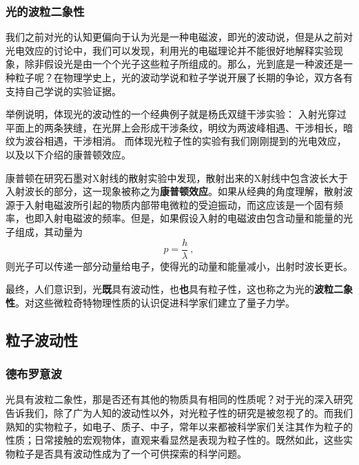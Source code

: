\subsubsection{光的波粒二象性}
我们之前对光的认知更偏向于认为光是一种电磁波，即光的波动说，但是从之前对光电效应的讨论中，我们可以发现，利用光的电磁理论并不能很好地解释实验现象，除非假设光是由一个个光子这些粒子所组成的。那么，光到底是一种波还是一种粒子呢？在物理学史上，光的波动学说和粒子学说开展了长期的争论，双方各有支持自己学说的实验证据。

举例说明，体现光的波动性的一个经典例子就是杨氏双缝干涉实验：
入射光穿过平面上的两条狭缝，在光屏上会形成干涉条纹，明纹为两波峰相遇、干涉相长，暗纹为波谷相遇，干涉相消。
而体现光粒子性的实验有我们刚刚提到的光电效应，以及以下介绍的康普顿效应。

康普顿在研究石墨对X射线的散射实验中发现，散射出来的X射线中包含波长大于入射波长的部分，这一现象被称之为\textbf{康普顿效应}。如果从经典的角度理解，散射波源于入射电磁波所引起的物质内部带电微粒的受迫振动，而这应该是一个固有频率，也即入射电磁波的频率。但是，如果假设入射的电磁波由包含动量和能量的光子组成，其动量为$$p=\dfrac{h}{\lambda}~,$$则光子可以传递一部分动量给电子，使得光的动量和能量减小，出射时波长更长。

最终，人们意识到，光\textbf{既}具有波动性，也\textbf{也}具有粒子性，这也称之为光的\textbf{波粒二象性}。对这些微粒奇特物理性质的认识促进科学家们建立了量子力学。


\subsection{粒子波动性}
\subsubsection{德布罗意波}
光具有波粒二象性，那是否还有其他的物质具有相同的性质呢？对于光的深入研究告诉我们，除了广为人知的波动性以外，对光粒子性的研究是被忽视了的。而我们熟知的实物粒子，如电子、质子、中子，常年以来都被科学家们关注其作为粒子的性质；日常接触的宏观物体，直观来看显然是表现为粒子性的。既然如此，这些实物粒子是否具有波动性成为了一个可供探索的科学问题。

